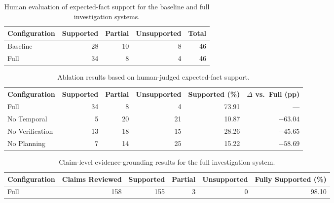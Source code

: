 
\begin{table}[!t]
\centering
\caption{Human evaluation of expected-fact support for the baseline and full investigation systems.}
\label{tab:fact-support}
\begin{tabular}{lrrrr}
\toprule
Configuration & Supported & Partial & Unsupported & Total \\
\midrule
Baseline & 28 & 10 & 8 & 46 \\
Full & 34 & 8 & 4 & 46 \\
\bottomrule
\end{tabular}
\end{table}

\begin{table}[!t]
\centering
\caption{Ablation results based on human-judged expected-fact support.}
\label{tab:ablation}
\begin{tabular}{lrrrrr}
\toprule
Configuration & Supported & Partial & Unsupported & Supported (\%) & $\Delta$ vs.\ Full (pp) \\
\midrule
Full & 34 & 8 & 4 & 73.91 & --- \\
No Temporal & 5 & 20 & 21 & 10.87 & $-63.04$ \\
No Verification & 13 & 18 & 15 & 28.26 & $-45.65$ \\
No Planning & 7 & 14 & 25 & 15.22 & $-58.69$ \\
\bottomrule
\end{tabular}
\end{table}

\begin{table}[!t]
\centering
\caption{Claim-level evidence-grounding results for the full investigation system.}
\label{tab:claim-grounding}
\begin{tabular}{lrrrrr}
\toprule
Configuration & Claims Reviewed & Supported & Partial & Unsupported & Fully Supported (\%) \\
\midrule
Full & 158 & 155 & 3 & 0 & 98.10 \\
\bottomrule
\end{tabular}
\end{table}

